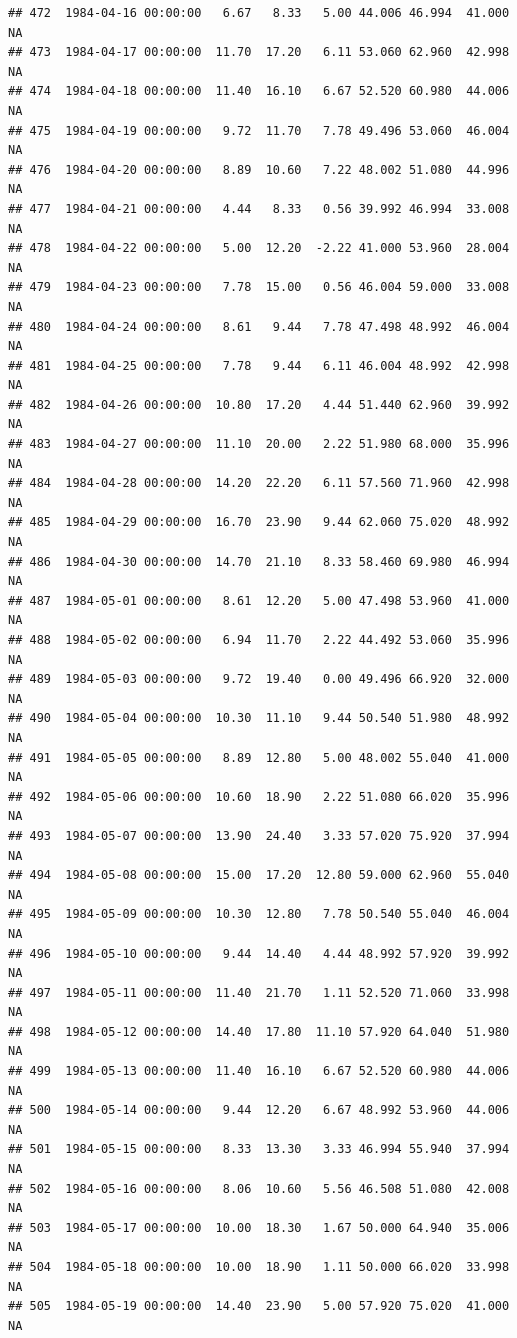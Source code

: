 \documentclass{article}\usepackage{graphicx, color}
\makeatletter
\newenvironment{kframe}{%
 \def\at@end@of@kframe{}%
 \ifinner\ifhmode%
  \def\at@end@of@kframe{\end{minipage}}%
  \begin{minipage}{\columnwidth}%
 \fi\fi%
 \def\FrameCommand##1{\hskip\@totalleftmargin \hskip-\fboxsep
 \colorbox{shadecolor}{##1}\hskip-\fboxsep
     \hskip-\linewidth \hskip-\@totalleftmargin \hskip\columnwidth}%
 \MakeFramed {\advance\hsize-\width
   \@totalleftmargin\z@ \linewidth\hsize
   \@setminipage}}%
 {\par\unskip\endMakeFramed%
 \at@end@of@kframe}
\newenvironment{knitrout}{}{} %
\makeatother
\begin{document}
\begin{knitrout}
\begin{kframe}
\begin{verbatim}
## 472  1984-04-16 00:00:00   6.67   8.33   5.00 44.006 46.994  41.000     NA
## 473  1984-04-17 00:00:00  11.70  17.20   6.11 53.060 62.960  42.998     NA
## 474  1984-04-18 00:00:00  11.40  16.10   6.67 52.520 60.980  44.006     NA
## 475  1984-04-19 00:00:00   9.72  11.70   7.78 49.496 53.060  46.004     NA
## 476  1984-04-20 00:00:00   8.89  10.60   7.22 48.002 51.080  44.996     NA
## 477  1984-04-21 00:00:00   4.44   8.33   0.56 39.992 46.994  33.008     NA
## 478  1984-04-22 00:00:00   5.00  12.20  -2.22 41.000 53.960  28.004     NA
## 479  1984-04-23 00:00:00   7.78  15.00   0.56 46.004 59.000  33.008     NA
## 480  1984-04-24 00:00:00   8.61   9.44   7.78 47.498 48.992  46.004     NA
## 481  1984-04-25 00:00:00   7.78   9.44   6.11 46.004 48.992  42.998     NA
## 482  1984-04-26 00:00:00  10.80  17.20   4.44 51.440 62.960  39.992     NA
## 483  1984-04-27 00:00:00  11.10  20.00   2.22 51.980 68.000  35.996     NA
## 484  1984-04-28 00:00:00  14.20  22.20   6.11 57.560 71.960  42.998     NA
## 485  1984-04-29 00:00:00  16.70  23.90   9.44 62.060 75.020  48.992     NA
## 486  1984-04-30 00:00:00  14.70  21.10   8.33 58.460 69.980  46.994     NA
## 487  1984-05-01 00:00:00   8.61  12.20   5.00 47.498 53.960  41.000     NA
## 488  1984-05-02 00:00:00   6.94  11.70   2.22 44.492 53.060  35.996     NA
## 489  1984-05-03 00:00:00   9.72  19.40   0.00 49.496 66.920  32.000     NA
## 490  1984-05-04 00:00:00  10.30  11.10   9.44 50.540 51.980  48.992     NA
## 491  1984-05-05 00:00:00   8.89  12.80   5.00 48.002 55.040  41.000     NA
## 492  1984-05-06 00:00:00  10.60  18.90   2.22 51.080 66.020  35.996     NA
## 493  1984-05-07 00:00:00  13.90  24.40   3.33 57.020 75.920  37.994     NA
## 494  1984-05-08 00:00:00  15.00  17.20  12.80 59.000 62.960  55.040     NA
## 495  1984-05-09 00:00:00  10.30  12.80   7.78 50.540 55.040  46.004     NA
## 496  1984-05-10 00:00:00   9.44  14.40   4.44 48.992 57.920  39.992     NA
## 497  1984-05-11 00:00:00  11.40  21.70   1.11 52.520 71.060  33.998     NA
## 498  1984-05-12 00:00:00  14.40  17.80  11.10 57.920 64.040  51.980     NA
## 499  1984-05-13 00:00:00  11.40  16.10   6.67 52.520 60.980  44.006     NA
## 500  1984-05-14 00:00:00   9.44  12.20   6.67 48.992 53.960  44.006     NA
## 501  1984-05-15 00:00:00   8.33  13.30   3.33 46.994 55.940  37.994     NA
## 502  1984-05-16 00:00:00   8.06  10.60   5.56 46.508 51.080  42.008     NA
## 503  1984-05-17 00:00:00  10.00  18.30   1.67 50.000 64.940  35.006     NA
## 504  1984-05-18 00:00:00  10.00  18.90   1.11 50.000 66.020  33.998     NA
## 505  1984-05-19 00:00:00  14.40  23.90   5.00 57.920 75.020  41.000     NA

\end{verbatim}
\end{kframe}
\end{knitrout}
\end{document}

